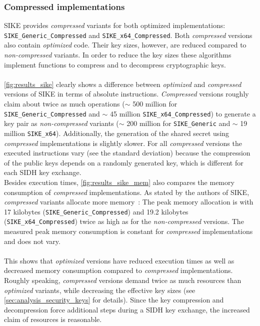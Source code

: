 \subsubsection{Compressed implementations}
\gls{SIKE} provides \textit{compressed} variants for both optimized implementations:\\ \texttt{SIKE\_Generic\_Compressed} and \texttt{SIKE\_x64\_Compressed}.
Both \textit{compressed} versions also contain \textit{optimized} code. Their key sizes, however, are reduced compared to \textit{non-compressed} variants. In order to reduce the key sizes these algorithms implement functions to compress and to decompress cryptographic keys.
\\\\
\autoref{fig:results_sike} clearly shows a difference between \textit{optimized} and \textit{compressed} versions of \gls{SIKE} in terms of absolute instructions. \textit{Compressed} versions roughly claim about twice as much operations ($\sim$ 500 million for \texttt{SIKE\_Generic\_Compressed} and $\sim$ 45 million \texttt{SIKE\_x64\_Compressed}) to generate a key pair as \textit{non-compressed} variants ($\sim$ 200 million for \texttt{SIKE\_Generic} and $\sim$ 19 million \texttt{SIKE\_x64}). Additionally, the generation of the shared secret using \textit{compressed} implementations is slightly slower. For all \textit{compressed} versions the executed instructions vary (see the standard deviation) because the compression of the public keys depends on a randomly generated key, which is different for each \gls{SIDH} key exchange.\\
Besides execution times, \autoref{fig:results_sike_mem} also compares the memory consumption of \textit{compressed} implementations. As stated by the authors of \gls{SIKE}, \textit{compressed} variants allocate more memory~\parencite{sike2020spec}: The peak memory allocation is with 17 kilobytes (\texttt{SIKE\_Generic\_Compressed}) and 19.2 kilobytes (\texttt{SIKE\_x64\_Compressed}) twice as high as for the \textit{non-compressed} versions. The measured peak memory consumption is constant for \textit{compressed} implementations and does not vary.
\\\\
This shows that \textit{optimized} versions have reduced execution times as well as decreased memory consumption compared to \textit{compressed} implementations. Roughly speaking, \textit{compressed} versions demand twice as much resources than \textit{optimized} variants, while decreasing the effective key sizes (see \autoref{sec:analysis_security_keys} for details). Since the key compression and decompression force additional steps during a \gls{SIDH} key exchange, the increased claim of resources is reasonable.



